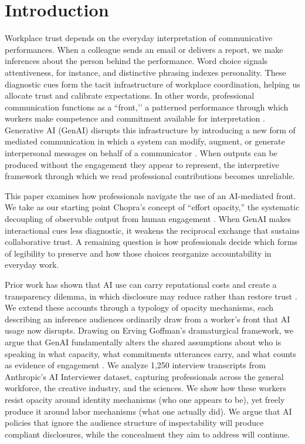 \documentclass[pdflatex,sn-basic]{sn-jnl}%
\theoremstyle{thmstyleone}%
\theoremstyle{thmstyletwo}%
\theoremstyle{thmstylethree}%
\begin{document}
\section{Introduction}

Workplace trust depends on the everyday interpretation of communicative performances. When a colleague sends an email or delivers a report, we make inferences about the person behind the performance. Word choice signals attentiveness, for instance, and distinctive phrasing indexes personality. These diagnostic cues form the tacit infrastructure of workplace coordination, helping us allocate trust and calibrate expectations. In other words, professional communication functions as a ``front,’’ a patterned performance through which workers make competence and commitment available for interpretation \citep{goffman1959presentation}. Generative AI (GenAI) disrupts this infrastructure by introducing a new form of mediated communication in which a system can modify, augment, or generate interpersonal messages on behalf of a communicator \citep{hancock2020aimediated}. When outputs can be produced without the engagement they appear to represent, the interpretive framework through which we read professional contributions becomes unreliable.

This paper examines how professionals navigate the use of an AI-mediated front. We take as our starting point Chopra's concept of ``effort opacity,'' the systematic decoupling of observable output from human engagement \citep{chopra2026engagement}. When GenAI makes interactional cues less diagnostic, it weakens the reciprocal exchange that sustains collaborative trust. A remaining question is how professionals decide which forms of legibility to preserve and how those choices reorganize accountability in everyday work.

Prior work has shown that AI use can carry reputational costs and create a transparency dilemma, in which disclosure may reduce rather than restore trust \citep{schilke2025transparency, reif2025social}. We extend these accounts through a typology of opacity mechanisms, 
each describing an inference audiences ordinarily draw from a worker's front that AI usage now disrupts.
Drawing on Erving Goffman's dramaturgical framework, we argue that GenAI fundamentally alters the shared assumptions about who is speaking in what capacity, what commitments utterances carry, and what counts as evidence of engagement \citep{goffman1959presentation}. 
We analyze 1,250 interview transcripts from Anthropic's AI Interviewer dataset, capturing professionals across the general workforce, the creative industry, and the sciences. We show how these workers resist opacity around identity mechanisms (who one appears to be), yet freely produce it around labor mechanisms (what one actually did). We argue that AI policies that ignore the audience structure of inspectability will produce compliant disclosures, while the concealment they aim to address will continue.
\end{document}
